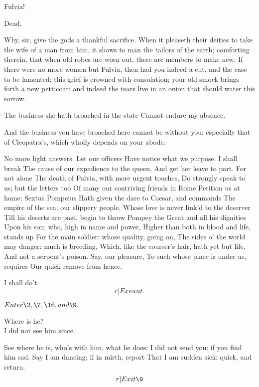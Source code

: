 \documentclass{book}
\begin{document}
\begin{PROSE}
	Fulvia!

\1	Dead.

	Why, sir, give the gods a thankful sacrifice. When
	it pleaseth their deities to take the wife of a man
	from him, it shows to man the tailors of the earth;
	comforting therein, that when old robes are worn
	out, there are members to make new. If there were
	no more women but Fulvia, then had you indeed a cut,
	and the case to be lamented: this grief is crowned
	with consolation; your old smock brings forth a new
	petticoat: and indeed the tears live in an onion
	that should water this sorrow.

\1	The business she hath broached in the state
	Cannot endure my absence.

	And the business you have broached here cannot be
	without you; especially that of Cleopatra's, which
	wholly depends on your abode.

\end{PROSE}

\1	No more light answers. Let our officers
	Have notice what we purpose. I shall break
	The cause of our expedience to the queen,
	And get her leave to part. For not alone
	The death of Fulvia, with more urgent touches,
	Do strongly speak to us; but the letters too
	Of many our contriving friends in Rome
	Petition us at home: Sextus Pompeius 
	Hath given the dare to Caesar, and commands
	The empire of the sea: our slippery people,
	Whose love is never link'd to the deserver
	Till his deserts are past, begin to throw
	Pompey the Great and all his dignities 
	Upon his son; who, high in name and power,
	Higher than both in blood and life, stands up
	For the main soldier: whose quality, going on,
	The sides o' the world may danger: much is breeding,
	Which, like the courser's hair, hath yet but life,
	And not a serpent's poison. Say, our pleasure,
	To such whose place is under us, requires
	Our quick remove from hence.

	I shall do't. 	\[r]Exeunt.\]




	\(Enter \2, \7, \16, and \9.\)

\2	Where is he? \\

\7	                  I did not see him since.

\2	See where he is, who's with him, what he does:
	I did not send you: if you find him sad,
	Say I am dancing; if in mirth, report
	That I am sudden sick: quick, and return. \[r]Exit \9\]
\end{document}
